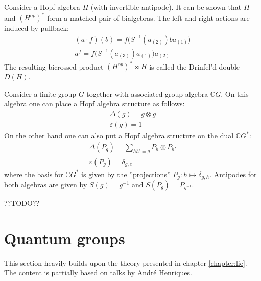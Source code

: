 	\begin{construct}
		Consider a Hopf algebra $H$ (with invertible antipode). It can be shown that $H$ and $(H^{op})^*$ form a matched pair of bialgebras. The left and right actions are induced by pullback:
		\begin{gather}
			(a\cdot f)(b) = f\big(S^{-1}(a_{(2)})ba_{(1)}\big)\\
			a^f = f\big(S^{-1}(a_{(3)})a_{(1)}\big)a_{(2)}
		\end{gather}
		The resulting bicrossed product $(H^{op})^*\bowtie H$ is called the Drinfel'd double $D(H)$.
	\end{construct}
	\begin{example}
		Consider a finite group $G$ together with associated group algebra $\mathbb{C}G$. On this algebra one can place a Hopf algebra structure as follows:
		\begin{gather}
			\Delta(g) = g\otimes g\\
			\varepsilon(g) = 1
		\end{gather}
		On the other hand one can also put a Hopf algebra structure on the dual $\mathbb{C}G^*$:
		\begin{gather}
			\Delta(P_g) = \sum_{hh'=g}P_h\otimes P_{h'}\\
			\varepsilon(P_g) = \delta_{g, e}
		\end{gather}
		where the basis for $\mathbb{C}G^*$ is given by the ''projections'' $P_g:h\mapsto\delta_{g,h}$. Antipodes for both algebras are given by $S(g)=g^{-1}$ and $S(P_g) = P_{g^{-1}}$.
		
		??TODO??
	\end{example}

\section{Quantum groups}

	This section heavily builds upon the theory presented in chapter \ref{chapter:lie}. The content is partially based on talks by Andr\'e Henriques.


